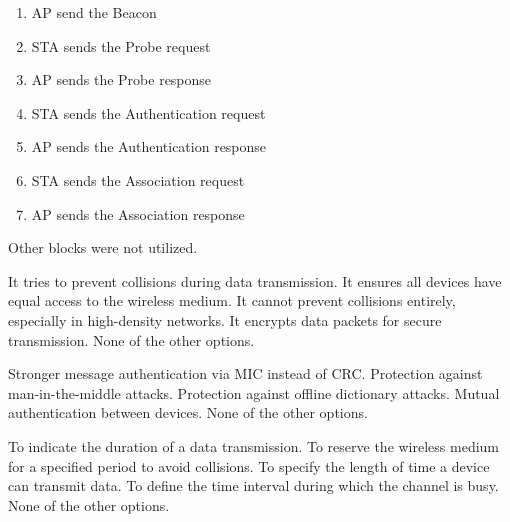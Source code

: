 \begin{solution}
    \begin{enumerate}
        \item AP send the Beacon
        \item STA sends the Probe request
        \item AP sends the Probe response
        \item STA sends the Authentication request
        \item AP sends the Authentication response
        \item STA sends the Association request
        \item AP sends the Association response
    \end{enumerate}
    Other blocks were not utilized.
\end{solution}

\begin{checkboxes}
    \CorrectChoice It tries to prevent collisions during data transmission.
    \CorrectChoice It ensures all devices have equal access to the wireless medium.
    \CorrectChoice It cannot prevent collisions entirely, especially in high-density networks.
    \choice It encrypts data packets for secure transmission.
    \choice None of the other options.
\end{checkboxes}


\begin{checkboxes}
    \choice Stronger message authentication via MIC instead of CRC.
    \CorrectChoice Protection against man-in-the-middle attacks.
    \CorrectChoice Protection against offline dictionary attacks.
    \CorrectChoice Mutual authentication between devices.
    \choice None of the other options.
\end{checkboxes}

\begin{checkboxes}
    \choice To indicate the duration of a data transmission.
    \CorrectChoice To reserve the wireless medium for a specified period to avoid collisions.
    \choice To specify the length of time a device can transmit data.
    \choice To define the time interval during which the channel is busy.
    \choice None of the other options.
\end{checkboxes}

